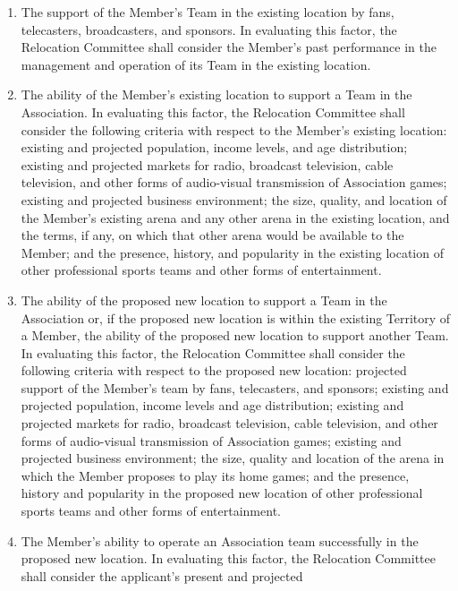 \documentclass[]{book}
\providecommand{\tightlist}{%
  \setlength{\itemsep}{0pt}\setlength{\parskip}{0pt}}
\theoremstyle{definition}
\theoremstyle{definition}
\theoremstyle{definition}
\theoremstyle{remark}
\begin{document}
\begin{enumerate}
  \begin{enumerate}
  \def\labelenumii{(\roman{enumii})}
  \tightlist
  \item
    The support of the Member's Team in the existing location by fans,
    telecasters, broadcasters, and sponsors. In evaluating this factor,
    the Relocation Committee shall consider the Member's past
    performance in the management and operation of its Team in the
    existing location.
  \item
    The ability of the Member's existing location to support a Team in
    the Association. In evaluating this factor, the Relocation Committee
    shall consider the following criteria with respect to the Member's
    existing location: existing and projected population, income levels,
    and age distribution; existing and projected markets for radio,
    broadcast television, cable television, and other forms of
    audio-visual transmission of Association games; existing and
    projected business environment; the size, quality, and location of
    the Member's existing arena and any other arena in the existing
    location, and the terms, if any, on which that other arena would be
    available to the Member; and the presence, history, and popularity
    in the existing location of other professional sports teams and
    other forms of entertainment.
  \item
    The ability of the proposed new location to support a Team in the
    Association or, if the proposed new location is within the existing
    Territory of a Member, the ability of the proposed new location to
    support another Team. In evaluating this factor, the Relocation
    Committee shall consider the following criteria with respect to the
    proposed new location: projected support of the Member's team by
    fans, telecasters, and sponsors; existing and projected population,
    income levels and age distribution; existing and projected markets
    for radio, broadcast television, cable television, and other forms
    of audio-visual transmission of Association games; existing and
    projected business environment; the size, quality and location of
    the arena in which the Member proposes to play its home games; and
    the presence, history and popularity in the proposed new location of
    other professional sports teams and other forms of entertainment.
  \item
    The Member's ability to operate an Association team successfully in
    the proposed new location. In evaluating this factor, the Relocation
    Committee shall consider the applicant's present and projected

\end{enumerate}
\end{enumerate}
\end{document}
